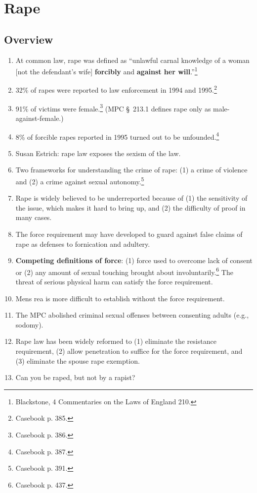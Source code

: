 \section{Rape}

\subsection{Overview}

\begin{enumerate}
    \item At common law, rape was defined as ``unlawful carnal knowledge of a 
    woman [not the defendant's wife] \textbf{forcibly} and \textbf{against her 
    will}.''\footnote{Blackstone, 4 Commentaries on the Laws of England 210.}
    \item 32\% of rapes were reported to law enforcement in 1994 and 
    1995.\footnote{Casebook p. 385.}
    \item 91\% of victims were female.\footnote{Casebook p. 386.} (MPC \S\ 
    213.1 defines rape only as male-against-female.)
    \item 8\% of forcible rapes reported in 1995 turned out to be 
    unfounded.\footnote{Casebook p. 387.}
    \item Susan Estrich: rape law exposes the sexism of the law.
    \item Two frameworks for understanding the crime of rape: (1) a crime of 
    violence and (2) a crime against sexual autonomy.\footnote{Casebook p.  
    391.}
    \item Rape is widely believed to be underreported because of (1) the 
    sensitivity of the issue, which makes it hard to bring up, and (2) the 
    difficulty of proof in many cases.
    \item The force requirement may have developed to guard against false 
    claims of rape as defenses to fornication and adultery.
    \item \textbf{Competing definitions of force}: (1) force used to overcome 
    lack of consent or (2) any amount of sexual touching brought about 
    involuntarily.\footnote{Casebook p. 437.} The threat of serious physical 
    harm can satisfy the force requirement.
    \item Mens rea is more difficult to establish without the force 
    requirement.
    \item The MPC abolished criminal sexual offenses between consenting adults 
    (e.g., sodomy).
    \item Rape law has been widely reformed to (1) eliminate the resistance 
    requirement, (2) allow penetration to suffice for the force requirement, 
    and (3) eliminate the spouse rape exemption.
    \item Can you be raped, but not by a rapist?
\end{enumerate}

